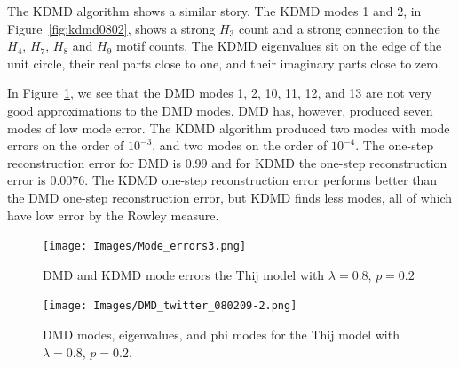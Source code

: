 The KDMD algorithm shows a similar story. The KDMD modes 1 and 2, in Figure~\ref{fig:kdmd0802},
 shows a strong $H_{3}$ count and a strong connection to the $H_{4}$, $H_{7}$, $H_{8}$ and $H_{9}$ motif counts. 
The KDMD eigenvalues sit on the edge of the unit circle,
their real parts close to one, and their imaginary parts close to zero. 

In Figure~\ref{fig:0802modeerrors}, we see that the DMD modes 1, 2, 10, 11, 12, and 13 are not very good approximations 
to the DMD modes. DMD has, however, produced seven modes of low mode error. The KDMD algorithm produced two modes with
mode errors on the order of $10^{-3}$, and two modes on
the order of $10^{-4}$. The one-step reconstruction error for DMD is $0.99$
 and for KDMD the one-step reconstruction error is $0.0076$. The KDMD one-step reconstruction
error performs better than the DMD one-step reconstruction error, but KDMD finds less modes,
 all of which have low error by the Rowley measure.

\begin{figure}
    \texttt{[image: Images/Mode\_errors3.png]}
    \centering
    \caption{DMD and KDMD mode errors the Thij model with $\lambda=0.8$, $p=0.2$ \label{fig:0802modeerrors}}
\end{figure}




\begin{figure}
    \texttt{[image: Images/DMD\_twitter\_080209-2.png]}
    \centering
    \caption{DMD modes, eigenvalues, and phi modes for the Thij model
    with $\lambda=0.8$, $p=0.2$. \label{fig:dmd0802}}
\end{figure}


